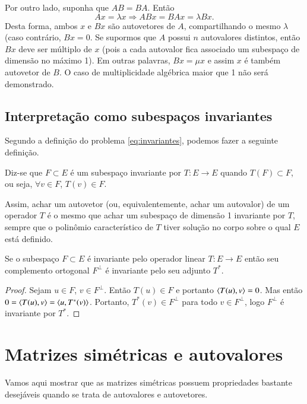 Por outro lado, suponha que $AB=BA$. Então
\begin{equation*}
  Ax=\lambda x \Rightarrow ABx = BAx = \lambda Bx.
\end{equation*}
Desta forma, ambos $x$ e $Bx$ são autovetores de $A$, compartilhando o mesmo $\lambda$ (caso contrário, $Bx=0$. Se supormos que $A$ possui $n$ autovalores distintos, então $Bx$ deve ser múltiplo de $x$ (pois a cada autovalor fica associado um subespaço de dimensão no máximo 1). Em outras palavras, $Bx= \mu x$ e assim $x$ é também autovetor de $B$. O caso de multiplicidade algébrica maior que 1 não será demonstrado. 
\epr

\subsection{Interpretação como subespaços invariantes}

Segundo a definição do problema \eqref{eq:invariantes}, podemos fazer a seguinte definição.
\begin{defi}
  Diz-se que $F\subset E$ é um subespaço invariante por $T:E\rightarrow E$ quando $T(F)\subset F$, ou seja, $\forall v\in F$, $T(v)\in F$.
\end{defi}
Assim, achar um autovetor (ou, equivalentemente, achar um autovalor) de um operador $T$ é o mesmo que achar um subespaço de dimensão 1 invariante por $T$, sempre que o polinômio característico de $T$ tiver solução no corpo sobre o qual $E$ está definido.

\begin{teo}\label{teo:13.1}
  Se o subespaço $F\subset E$ é invariante pelo operador linear $T:E\rightarrow E$ então seu complemento ortogonal $F^{\perp}$ é invariante pelo seu adjunto $T^*$.
\end{teo}
\begin{proof}
Sejam $u\in F$, $v\in F^{\perp}$. Então $T(u)\in F$ e portanto $\langle T(u), v \rangle=0$. Mas então $0 = \langle T(u), v \rangle = \langle u, T^*(v) \rangle$. Portanto, $T^*(v)\in F^{\perp}$ para todo $v\in F^{\perp}$, logo $F^{\perp}$ é invariante por $T^*$.
\end{proof}

\section{Matrizes simétricas e autovalores}

Vamos aqui mostrar que as matrizes simétricas possuem propriedades bastante desejáveis quando se trata de autovalores e autovetores.

